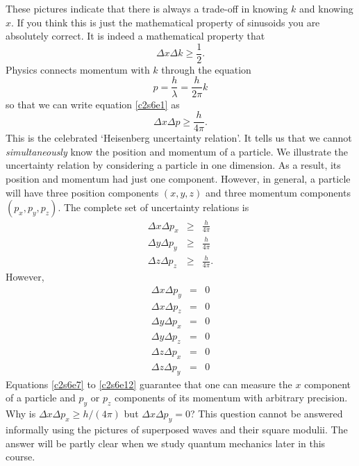 These pictures indicate that there is always a trade-off in knowing $k$ and
knowing $x$. If you think this is just the mathematical property of sinusoids
you are absolutely correct. It is indeed a mathematical property that
\begin{equation}\label{c2s6e1}
\Delta x \Delta k \ge \frac{1}{2}.
\end{equation}
Physics connects momentum with $k$ through the equation
\begin{equation}\label{c2s6e2}
p = \frac{h}{\lambda} = \frac{h}{2\pi}k
\end{equation}
so that we can write equation \eqref{c2s6e1} as
\begin{equation}\label{c2s6e3}
\Delta x \Delta p \ge \frac{h}{4\pi}.
\end{equation}
This is the celebrated `Heisenberg uncertainty relation'. It tells us that
we cannot \emph{simultaneously} know the position and momentum of a particle.
We illustrate the uncertainty relation by considering a particle in one 
dimension. As a result, its position and momentum had just one component. 
However, in general, a particle will have three position components $(x, y, z)$
and three momentum components $(p_x, p_y, p_z)$. The complete set of uncertainty
relations is
\begin{eqnarray}
\Delta x \Delta p_x &\ge& \frac{h}{4\pi} \label{c2s6e4} \\
\Delta y \Delta p_y &\ge& \frac{h}{4\pi} \label{c2s6e5} \\
\Delta z \Delta p_z &\ge& \frac{h}{4\pi}. \label{c2s6e6}
\end{eqnarray}
However,
\begin{eqnarray}
\Delta x \Delta p_y &=& 0 \label{c2s6e7} \\
\Delta x \Delta p_z &=& 0 \label{c2s6e8} \\
\Delta y \Delta p_x &=& 0 \label{c2s6e9} \\
\Delta y \Delta p_z &=& 0 \label{c2s6e10} \\
\Delta z \Delta p_x &=& 0 \label{c2s6e11} \\
\Delta z \Delta p_y &=& 0 \label{c2s6e12}
\end{eqnarray}
Equations \eqref{c2s6e7} to \eqref{c2s6e12} guarantee that one can measure the
$x$ component of a particle and $p_y$ or $p_z$ components of its momentum with
arbitrary precision. Why is $\Delta x \Delta p_x \ge h/(4\pi)$ but $\Delta x
\Delta p_y = 0$? This question cannot be answered informally using the pictures
of superposed waves and their square modulii. The answer will be partly clear
when we study quantum mechanics later in this course.

